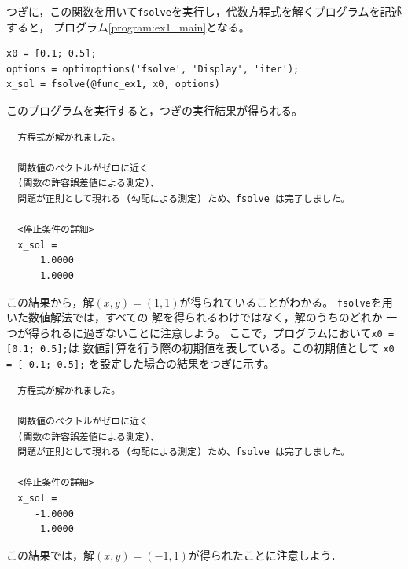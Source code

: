 \documentclass[tombow,dvipdfmx]{corona-a5-1.1}
\begin{document}
つぎに，この関数を用いて\texttt{fsolve}を実行し，代数方程式を解くプログラムを記述すると，
プログラム\nobreak\ref{program:ex1_main}となる。
\begin{PROGRAMA}[count,title={main\_ex1.m}]\label{program:ex1_main}
\begin{verbatim}
x0 = [0.1; 0.5];
options = optimoptions('fsolve', 'Display', 'iter');
x_sol = fsolve(@func_ex1, x0, options)
\end{verbatim}
\end{PROGRAMA}

このプログラムを実行すると，つぎの実行結果が得られる。

\begin{実行結果}
\begin{verbatim}
  方程式が解かれました。

  関数値のベクトルがゼロに近く 
  (関数の許容誤差値による測定)、
  問題が正則として現れる (勾配による測定) ため、fsolve は完了しました。
  
  <停止条件の詳細>
  x_sol =
      1.0000
      1.0000
\end{verbatim}
\end{実行結果}

この結果から，解$(x, y) = (1, 1)$が得られていることがわかる。
\texttt{fsolve}を用いた数値解法では，すべての
解を得られるわけではなく，解のうちのどれか
一つが得られるに過ぎないことに注意しよう。
ここで，プログラムにおいて\texttt{x0 = [0.1; 0.5];}は
数値計算を行う際の初期値を表している。この初期値として
\texttt{x0 = [-0.1; 0.5];}
を設定した場合の結果をつぎに示す。

\begin{実行結果}
\begin{verbatim}
  方程式が解かれました。

  関数値のベクトルがゼロに近く 
  (関数の許容誤差値による測定)、
  問題が正則として現れる (勾配による測定) ため、fsolve は完了しました。
  
  <停止条件の詳細>
  x_sol =
     -1.0000
      1.0000
\end{verbatim}
\end{実行結果}

この結果では，解$(x, y) = (-1, 1)$が得られたことに注意しよう．


\end{document}
